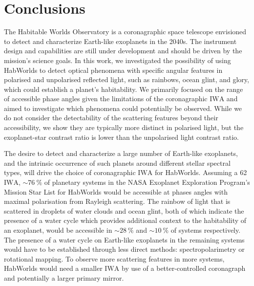 \documentclass[usenatbib]{mnras}
\newcommand{\IWA}{\ensuremath{\mathrm{IWA}}\xspace}
\newcommand{\HWO}{HabWorlds\xspace}
\begin{document}
\vspace{-2mm}
\section{Conclusions}
\label{sec:5}

The Habitable Worlds Observatory is a coronagraphic space telescope envisioned to detect and characterize Earth-like exoplanets in the 2040s. 
%
The instrument design and capabilities are still under development and should be driven by the mission's science goals.
%
In this work, we investigated the possibility of using \HWO to detect optical phenomena with specific angular features in polarised and unpolarised reflected light, such as rainbows, ocean glint, and glory, which could establish a planet's habitability. 
%
We primarily focused on the range of accessible phase angles given the limitations of the coronagraphic \IWA and aimed to investigate which phenomena could potentially be observed.
%
While we do not consider the detectability of the scattering features beyond their accessibility, we show they are typically more distinct in polarised light, but the exoplanet-star contrast ratio is lower than the unpolarised light contrast ratio.

The desire to detect and characterize a large number of Earth-like exoplanets, and the intrinsic occurrence of such planets around different stellar spectral types, will drive the choice of coronagraphic \IWA for \HWO. 
%
Assuming a \qty{62}{\mas} \IWA, $\sim\qty{76}{\percent}$ of planetary systems in the NASA Exoplanet Exploration Program's Mission Star List for \HWO would be accessible at phases angles with maximal polarisation from Rayleigh scattering.
%
The rainbow of light that is scattered in droplets of water clouds and ocean glint, both of which indicate the presence of a water cycle which provides additional context to the habitability of an exoplanet, would be accessible in $\sim\qty{28}{\percent}$ and $\sim\qty{10}{\percent}$ of systems respectively.
%
The presence of a water cycle on Earth-like exoplanets in the remaining systems would have to be established through less direct methods: spectropolarimetry or rotational mapping.
%
To observe more scattering features in more systems, \HWO would need a smaller \IWA by use of a better-controlled coronagraph and potentially a larger primary mirror.
\end{document}
